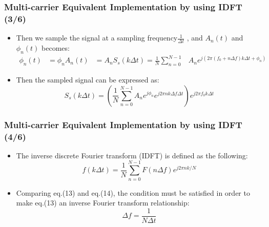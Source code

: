 \documentclass[xcolor=dvipsnames]{beamer} %
\def\\{}%
\begin{document}
\begin{frame}
    \frametitle{Multi-carrier Equivalent Implementation by using IDFT (3/6)}
    \begin{itemize}
        \item  Then we sample the signal at a sampling frequency$\frac{1}{\Delta t}$ , and $A_{n}(t)$ and $\phi_{n}(t)$ becomes:
        \begin{align}
            \phi_{n}(t)&=\phi_{n}\\
            A_{n}(t)&=A_{n}\\
            S_{s}(k\Delta t)=\frac{1}{N}\sum_{n=0}^{N-1}&A_{n}e^{j(2\pi(f_{0}+n\Delta f)k\Delta t+\phi_{n})}
        \end{align}
    \end{itemize}
    \begin{itemize}
        \item Then the sampled signal can be expressed as:
        \begin{equation}
            S_{s}(k\Delta t)=(\frac{1}{N}\sum_{n=0}^{N-1}A_{n}e^{j\phi_{n}}e^{j2\pi nk\Delta f\Delta t})e^{j2\pi f_{0}k\Delta t}       
        \end{equation}
    \end{itemize}
\end{frame}
\begin{frame}
    \frametitle{Multi-carrier Equivalent Implementation by using IDFT (4/6)}
    \begin{itemize}
        \item The inverse discrete Fourier transform (IDFT) is defined as the following:
        \begin{equation}
            f(k\Delta t)=\frac{1}{N}\sum_{n=0}^{N-1}F(n\Delta f)e^{j2\pi nk/N}
        \end{equation}
    \end{itemize}
    \begin{itemize}
        \item Comparing eq.(13) and eq.(14), the condition must be satisfied in order to make eq.(13) an inverse Fourier transform relationship:
        \begin{equation}
            \Delta f=\frac{1}{N\Delta t}
        \end{equation}
    \end{itemize}
\end{frame}
\end{document}
